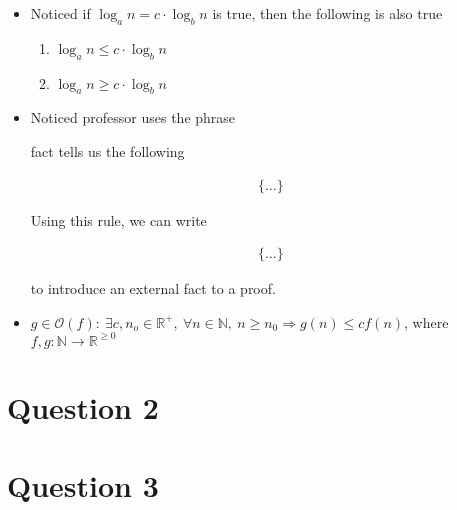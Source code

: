 \documentclass[12pt]{article}
\begin{document}
\begin{enumerate}[a.]
\begin{itemize}
        \item Noticed if $\log_a n = c \cdot \log_b n$ is true, then the following
        is also true

        \begin{enumerate}[1.]
            \item $\log_a n \leq c \cdot \log_b n$
            \item $\log_a n \geq c \cdot \log_b n$
        \end{enumerate}

        \item Noticed professor uses the phrase

        \bigskip

        \begin{mdframed}

        \underline{\hspace{1cm}} fact tells us the following

        \begin{align*}
            \bigl\{ \dots \bigr\}
        \end{align*}

        Using this rule, we can write

        \begin{align*}
            \bigl\{ \dots \bigr\}
        \end{align*}

        \end{mdframed}

        to introduce an external fact to a proof.

        \item

        $g \in \mathcal{O}(f):\:\exists c,n_o \in \mathbb{R}^{+},\:\forall n \in
        \mathbb{N},\:n \geq n_0 \Rightarrow g(n) \leq cf(n)$, where $f,g:\mathbb{N} \to \mathbb{R}^{\geq 0}$

    \end{itemize}

\end{enumerate}

\section*{Question 2}

\section*{Question 3}
\end{document}
